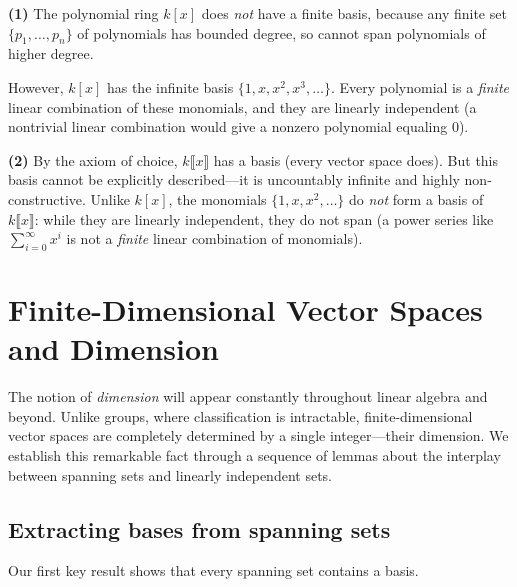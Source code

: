 \documentclass{report}
\begin{document}
\begin{solution}
\textbf{(1)} The polynomial ring \(k[x]\) does \emph{not} have a finite basis, because any finite set \(\{p_1, \ldots, p_n\}\) of polynomials has bounded degree, so cannot span polynomials of higher degree.

However, \(k[x]\) has the infinite basis \(\{1, x, x^2, x^3, \ldots\}\). Every polynomial is a \emph{finite} linear combination of these monomials, and they are linearly independent (a nontrivial linear combination would give a nonzero polynomial equaling \(0\)).

\textbf{(2)} By the axiom of choice, \(k\llbracket x \rrbracket\) has a basis (every vector space does). But this basis cannot be explicitly described---it is uncountably infinite and highly non-constructive. Unlike \(k[x]\), the monomials \(\{1, x, x^2, \ldots\}\) do \emph{not} form a basis of \(k\llbracket x \rrbracket\): while they are linearly independent, they do not span (a power series like \(\sum_{i=0}^\infty x^i\) is not a \emph{finite} linear combination of monomials).
\end{solution}



\section{Finite-Dimensional Vector Spaces and Dimension}

The notion of \emph{dimension} will appear constantly throughout linear algebra and beyond. Unlike groups, where classification is intractable, finite-dimensional vector spaces are completely determined by a single integer---their dimension. We establish this remarkable fact through a sequence of lemmas about the interplay between spanning sets and linearly independent sets.


\subsection{Extracting bases from spanning sets}

Our first key result shows that every spanning set contains a basis.

\end{document}
